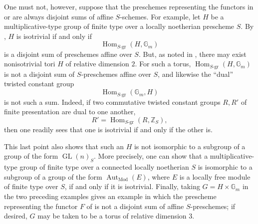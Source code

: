 One must not, however, suppose that the preschemes representing the
functors in  or
 are always disjoint sums of
affine \(S\)-schemes.  For example, let \(H\) be a
multiplicative-type group of finite type over a locally noetherian
prescheme \(S\).  By , \(H\) is isotrivial if and only
if
\[
  \operatorname{Hom}_{S\text{-}\mathrm{gr}}(H,\mathbb G_m)
\]
is a disjoint sum of preschemes affine over \(S\).  But, as noted in
, there may exist nonisotrivial tori \(H\) of relative
dimension \(2\).  For such a torus,
\(\operatorname{Hom}_{S\text{-}\mathrm{gr}}(H,\mathbb G_m)\) is not
a disjoint sum of \(S\)-preschemes affine over \(S\), and likewise
the ``dual'' twisted constant group
\[
  \operatorname{Hom}_{S\text{-}\mathrm{gr}}(\mathbb G_m,H)
\]
is not such a sum.  Indeed, if two commutative twisted constant
groups \(R,R'\) of finite presentation are dual to one another,
\[
  R'=\operatorname{Hom}_{S\text{-}\mathrm{gr}}(R,\mathbb Z_S),
\]
then one readily sees that one is isotrivial if and only if the
other is.

This last point also shows that such an \(H\) is not isomorphic to a
subgroup of a group of the form \(\operatorname{GL}(n)_S\).  More
precisely, one can show that a multiplicative-type group of finite
type over a connected locally noetherian \(S\) is isomorphic to a
subgroup of a group of the form
\(\operatorname{Aut}_{\mathrm{Mod}}(E)\), where \(E\) is a locally
free module of finite type over \(S\), if and only if it is
isotrivial.  Finally, taking \(G=H\times\mathbb G_m\) in the two
preceding examples gives an example in which the prescheme
representing the functor \(F\) of
 is not a disjoint sum of
affine \(S\)-preschemes; if desired, \(G\) may be taken to be a
torus of relative dimension \(3\).

